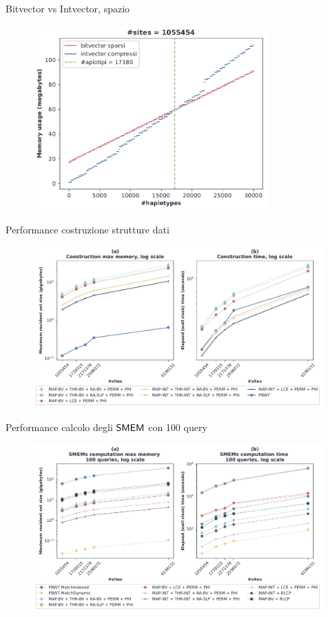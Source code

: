 \documentclass[]{beamer}
\def\SMEM{\mbox{\rm {\sf SMEM}}}
\begin{document}
\begin{frame}[plain]{Bitvector vs Intvector, spazio}
  \begin{figure}[H]
    \centering
    \hspace{-0.2cm}\includegraphics[width=0.8\textwidth]{img/bv_vs_iv2.pdf}
  \end{figure}
\end{frame}
\begin{frame}[plain]{Performance costruzione strutture dati}
  \begin{figure}[H]
    \centering
    \includegraphics[width=0.99\textwidth]{img/make_time_mem_paper2.pdf}
  \end{figure}
\end{frame}
\begin{frame}[plain]{Performance calcolo degli $\SMEM$ con 100 query}
  \begin{figure}[H]
    \centering
    \includegraphics[width=0.99\textwidth]{img/exe_time_mem_paper.pdf}
  \end{figure}
\end{frame}
\end{document}
